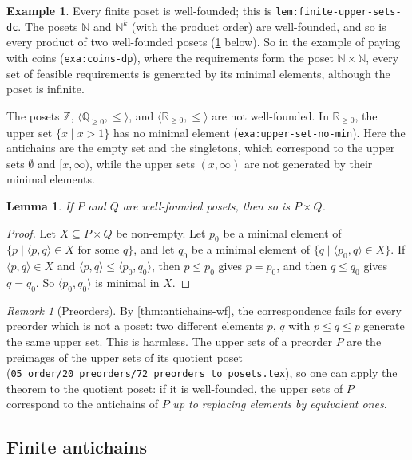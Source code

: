 \documentclass[11pt,a4paper]{article}
\theoremstyle{plain}
\newtheorem{lemma}[theorem]{Lemma}
\theoremstyle{definition}
\newtheorem{example}[theorem]{Example}
\theoremstyle{remark}
\newtheorem{remark}[theorem]{Remark}
\newcommand{\tup}[1]{\langle #1 \rangle}
\newcommand{\N}{\mathbb{N}}
\newcommand{\Z}{\mathbb{Z}}
\newcommand{\Rp}{\mathbb{R}_{\geq 0}}
\newcommand{\lbl}[1]{\nolinkurl{#1}}
\newcommand{\file}[1]{\nolinkurl{#1}}
\begin{document}
\begin{example}
    \label{exa:wf}
    Every finite poset is well-founded; this is \lbl{lem:finite-upper-sets-dc}.
    The posets $\N$ and $\N^k$ (with the product order) are well-founded, and so is every product of two well-founded posets (\cref{lem:wf-product} below).
    So in the example of paying with coins (\lbl{exa:coins-dp}), where the requirements form the poset $\N \times \N$, every set of feasible requirements is generated by its minimal elements, although the poset is infinite.

    The posets $\Z$, $\tup{\mathbb{Q}_{\geq 0}, \leq}$, and $\tup{\Rp, \leq}$ are not well-founded.
    In $\Rp$, the upper set $\{ x \mid x > 1 \}$ has no minimal element (\lbl{exa:upper-set-no-min}).
    Here the antichains are the empty set and the singletons, which correspond to the upper sets $\emptyset$ and $[x, \infty)$, while the upper sets $(x, \infty)$ are not generated by their minimal elements.
\end{example}

\begin{lemma}
    \label{lem:wf-product}
    If $P$ and $Q$ are well-founded posets, then so is $P \times Q$.
\end{lemma}
\begin{proof}
    Let $X \subseteq P \times Q$ be non-empty.
    Let $p_0$ be a minimal element of $\{ p \mid \tup{p,q} \in X \text{ for some } q \}$, and let $q_0$ be a minimal element of $\{ q \mid \tup{p_0, q} \in X \}$.
    If $\tup{p,q} \in X$ and $\tup{p,q} \leq \tup{p_0,q_0}$, then $p \leq p_0$ gives $p = p_0$, and then $q \leq q_0$ gives $q = q_0$.
    So $\tup{p_0,q_0}$ is minimal in $X$.
\end{proof}

\begin{remark}[Preorders]
    \label{rem:antichains-preorders}
    By \cref{thm:antichains-wf}, the correspondence fails for every preorder which is not a poset: two different elements $p$, $q$ with $p \leq q \leq p$ generate the same upper set.
    This is harmless.
    The upper sets of a preorder $P$ are the preimages of the upper sets of its quotient poset (\file{05_order/20_preorders/72_preorders_to_posets.tex}), so one can apply the theorem to the quotient poset: if it is well-founded, the upper sets of $P$ correspond to the antichains of $P$ \emph{up to replacing elements by equivalent ones}.
\end{remark}

\subsection{Finite antichains}
\end{document}
